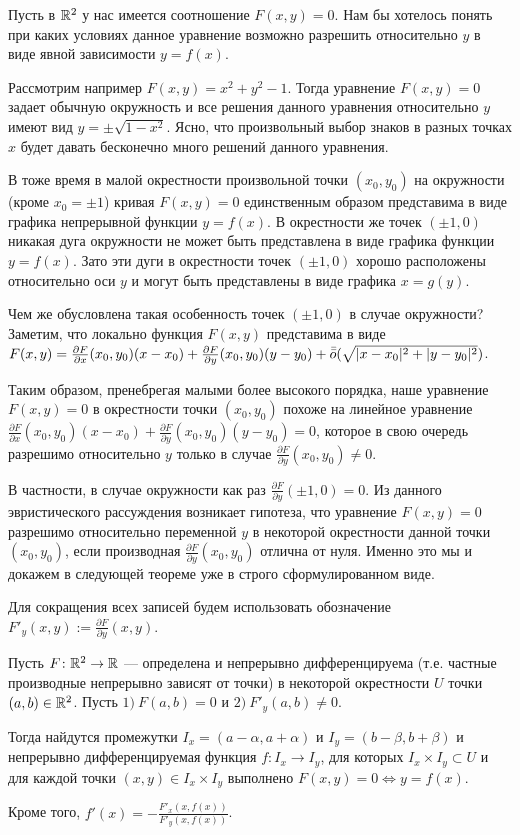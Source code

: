 \documentclass[a4paper]{article}
\theoremstyle{named}
\begin{document}
    Пусть в $\mathbb{R}^2$ у нас имеется соотношение $F(x,y)=0$. Нам бы хотелось понять при каких условиях данное уравнение возможно разрешить относительно $y$ в виде явной зависимости $y=f(x)$. 
    
    Рассмотрим например $F(x,y)=x^2+y^2-1$. Тогда уравнение $F(x,y)=0$ задает обычную окружность
    и все решения данного уравнения относительно $y$ имеют вид $y=\pm \sqrt{1-x^2}$.
    Ясно, что произвольный выбор знаков в разных точках $x$ будет давать бесконечно много решений данного уравнения.

    В тоже время в малой окрестности произвольной точки $(x_0,y_0)$ на окружности (кроме $x_0=\pm1$) кривая $F(x,y)=0$ единственным образом представима в виде графика непрерывной функции $y=f(x)$.
    В окрестности же точек $(\pm1,0)$ никакая дуга окружности не может быть представлена в виде графика функции $y=f(x)$.
    Зато эти дуги в окрестности точек $(\pm1,0)$ хорошо расположены относительно оси $y$ и могут быть представлены в виде графика $x=g(y)$.

    Чем же обусловлена такая особенность точек $(\pm1,0)$ в случае окружности? Заметим, что локально функция $F(x,y)$ представима в виде $F(x,y) = \frac{\partial F}{\partial x}(x_0,y_0)(x-x_0) + \frac{\partial F}{\partial y}(x_0,y_0)(y-y_0) + \bar{\bar{o}}(\sqrt{|x-x_0|^2+|y-y_0|^2})$.

    Таким образом, пренебрегая малыми более высокого порядка, наше уравнение $F(x,y)=0$ в окрестности точки $(x_0,y_0)$ похоже на линейное уравнение $\frac{\partial F}{\partial x}(x_0,y_0)(x-x_0) + \frac{\partial F}{\partial y}(x_0,y_0)(y-y_0)=0$, которое в свою очередь разрешимо относительно $y$ только в случае $\frac{\partial F}{\partial y}(x_0,y_0)\ne0$.

    В частности, в случае окружности как раз $\frac{\partial F}{\partial y}(\pm1,0)=0$. Из данного эвристического рассуждения возникает гипотеза, что уравнение $F(x,y)=0$ разрешимо относительно переменной $y$ в некоторой окрестности данной точки $(x_0,y_0)$, если производная $\frac{\partial F}{\partial y}(x_0,y_0)$ отлична от нуля. Именно это мы и докажем в следующей теореме уже в строго сформулированном виде.

    Для сокращения всех записей будем использовать обозначение $F'_y(x,y):=\frac{\partial F}{\partial y}(x,y)$.

    \begin{theorem*}
        Пусть $F\colon \mathbb{R}^2\to \mathbb{R}$ --- определена и непрерывно дифференцируема (т.е. частные производные непрерывно зависят от точки) в некоторой окрестности $U$ точки $(a,b)\in \mathbb{R}^2$. Пусть $1)\ F(a,b)=0$ и  $2)\ F'_y(a,b)\ne0$.

        Тогда найдутся промежутки $I_x = (a-\alpha, a+\alpha)$ и $I_y=(b-\beta, b+\beta)$ и непрерывно дифференцируемая функция $f\colon I_x\to I_y$, для которых $I_x\times I_y\subset U$ и для каждой точки $(x,y)\in I_x\times I_y$
        выполнено $F(x,y)=0 \Leftrightarrow y=f(x)$.

        Кроме того, $f'(x)=-\frac{F'_x(x,f(x))}{F'_y(x,f(x))}$.
    \end{theorem*}
\end{document}
